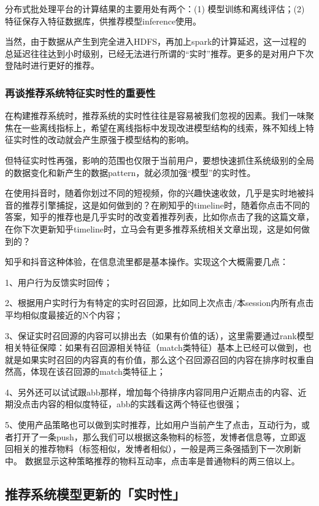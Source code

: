 \documentclass[12pt]{article}
\begin{document}
分布式批处理平台的计算结果的主要用处有两个：(1) 模型训练和离线评估；(2) 特征保存入特征数据库，供推荐模型inference使用。

当然，由于数据从产生到完全进入HDFS，再加上spark的计算延迟，这一过程的总延迟往往达到小时级别，已经无法进行所谓的“实时”推荐。更多的是对用户下次登陆时进行更好的推荐。

\subsubsection{再谈推荐系统特征实时性的重要性}
在构建推荐系统时，推荐系统的实时性往往是容易被我们忽视的因素。我们一味聚焦在一些离线指标上，希望在离线指标中发现改进模型结构的线索，殊不知线上特征实时性的改动就会产生原强于模型结构的影响。

但特征实时性再强，影响的范围也仅限于当前用户，要想快速抓住系统级别的全局的数据变化和新产生的数据pattern，就必须加强“模型”的实时性。

\begin{framed}
在使用抖音时，随着你划过不同的短视频，你的兴趣快速收敛，几乎是实时地被抖音的推荐引擎捕捉，这是如何做到的？在刷知乎的timeline时，随着你点击不同的答案，知乎的推荐也是几乎实时的改变着推荐列表，比如你点击了我的这篇文章，在你下次更新知乎timeline时，立马会有更多推荐系统相关文章出现，这是如何做到的？

知乎和抖音这种体验，在信息流里都是基本操作。实现这个大概需要几点：

1、用户行为反馈实时回传；

2、根据用户实时行为有特定的实时召回源，比如同上次点击/本session内所有点击平均相似度最接近的N个内容；

3、保证实时召回源的内容可以排出去（如果有价值的话），这里需要通过rank模型相关特征保障：如果有召回源相关特征（match类特征）基本上已经可以做到，也就是如果实时召回的内容真的有价值，那么这个召回源召回的内容在排序时权重自然高，体现在该召回源的match类特征上；

4、另外还可以试试跟abb那样，增加每个待排序内容同用户近期点击的内容、近期没点击内容的相似度特征，abb的实践看这两个特征也很强；

5、使用产品策略也可以做到实时推荐，比如用户当前产生了点击，互动行为，或者打开了一条push，那么我们可以根据这条物料的标签，发博者信息等，立即返回相关的推荐物料（标签相似，发博者相似），一般是两三条强插到下一次刷新中。 数据显示这种策略推荐的物料互动率，点击率是普通物料的两三倍以上。
\end{framed}

\subsection{推荐系统模型更新的「实时性」}
\end{document}
